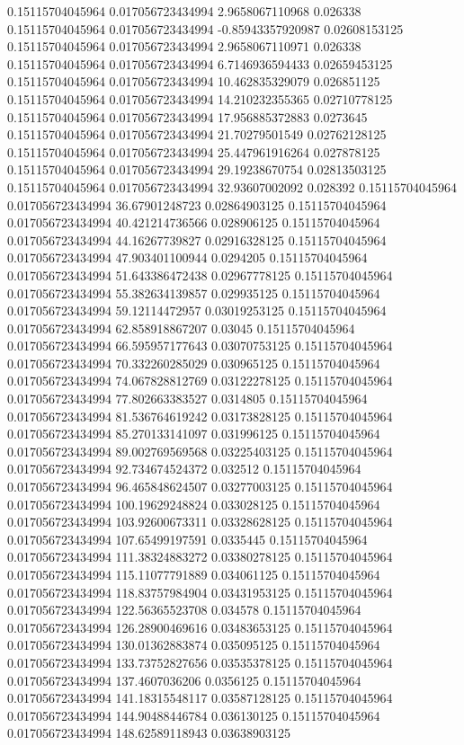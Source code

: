 0.15115704045964 0.017056723434994 2.9658067110968 0.026338
0.15115704045964 0.017056723434994 -0.85943357920987 0.02608153125
0.15115704045964 0.017056723434994 2.9658067110971 0.026338
0.15115704045964 0.017056723434994 6.7146936594433 0.02659453125
0.15115704045964 0.017056723434994 10.462835329079 0.026851125
0.15115704045964 0.017056723434994 14.210232355365 0.02710778125
0.15115704045964 0.017056723434994 17.956885372883 0.0273645
0.15115704045964 0.017056723434994 21.70279501549 0.02762128125
0.15115704045964 0.017056723434994 25.447961916264 0.027878125
0.15115704045964 0.017056723434994 29.19238670754 0.02813503125
0.15115704045964 0.017056723434994 32.93607002092 0.028392
0.15115704045964 0.017056723434994 36.67901248723 0.02864903125
0.15115704045964 0.017056723434994 40.421214736566 0.028906125
0.15115704045964 0.017056723434994 44.16267739827 0.02916328125
0.15115704045964 0.017056723434994 47.903401100944 0.0294205
0.15115704045964 0.017056723434994 51.643386472438 0.02967778125
0.15115704045964 0.017056723434994 55.382634139857 0.029935125
0.15115704045964 0.017056723434994 59.12114472957 0.03019253125
0.15115704045964 0.017056723434994 62.858918867207 0.03045
0.15115704045964 0.017056723434994 66.595957177643 0.03070753125
0.15115704045964 0.017056723434994 70.332260285029 0.030965125
0.15115704045964 0.017056723434994 74.067828812769 0.03122278125
0.15115704045964 0.017056723434994 77.802663383527 0.0314805
0.15115704045964 0.017056723434994 81.536764619242 0.03173828125
0.15115704045964 0.017056723434994 85.270133141097 0.031996125
0.15115704045964 0.017056723434994 89.002769569568 0.03225403125
0.15115704045964 0.017056723434994 92.734674524372 0.032512
0.15115704045964 0.017056723434994 96.465848624507 0.03277003125
0.15115704045964 0.017056723434994 100.19629248824 0.033028125
0.15115704045964 0.017056723434994 103.92600673311 0.03328628125
0.15115704045964 0.017056723434994 107.65499197591 0.0335445
0.15115704045964 0.017056723434994 111.38324883272 0.03380278125
0.15115704045964 0.017056723434994 115.11077791889 0.034061125
0.15115704045964 0.017056723434994 118.83757984904 0.03431953125
0.15115704045964 0.017056723434994 122.56365523708 0.034578
0.15115704045964 0.017056723434994 126.28900469616 0.03483653125
0.15115704045964 0.017056723434994 130.01362883874 0.035095125
0.15115704045964 0.017056723434994 133.73752827656 0.03535378125
0.15115704045964 0.017056723434994 137.4607036206 0.0356125
0.15115704045964 0.017056723434994 141.18315548117 0.03587128125
0.15115704045964 0.017056723434994 144.90488446784 0.036130125
0.15115704045964 0.017056723434994 148.62589118943 0.03638903125
